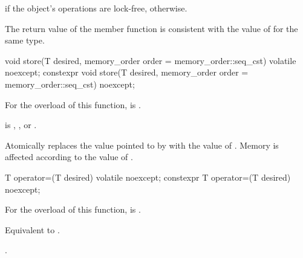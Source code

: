 \begin{itemdescr}
\pnum
\returns
{} if the object's operations are lock-free,  otherwise.
\begin{note}
The return value of the  member function
is consistent with the value of  for the same type.
\end{note}
\end{itemdescr}

%
%
%
%
%
%
\begin{itemdecl}
void store(T desired, memory_order order = memory_order::seq_cst) volatile noexcept;
constexpr void store(T desired, memory_order order = memory_order::seq_cst) noexcept;
\end{itemdecl}

\begin{itemdescr}
\pnum
\constraints
For the  overload of this function,
 is .

\pnum
\expects
{} is
,
, or
.

\pnum
\effects
Atomically replaces the value pointed to by 
with the value of . Memory is affected according to the value of
.
\end{itemdescr}

%
%
%
%
\begin{itemdecl}
T operator=(T desired) volatile noexcept;
constexpr T operator=(T desired) noexcept;
\end{itemdecl}

\begin{itemdescr}
\pnum
\constraints
For the  overload of this function,
 is .

\pnum
\effects
Equivalent to .

\pnum
\returns
{}.
\end{itemdescr}

